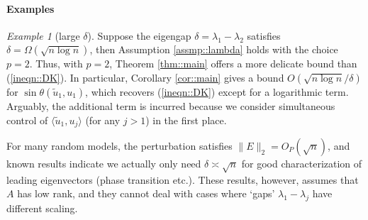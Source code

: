 \documentclass[12pt]{article}%
\theoremstyle{plain}%
\theoremstyle{remark}
\newtheorem{exm}{Example}[section]
\begin{document}
\paragraph{Examples} 
\begin{exm}[large $\delta$]
Suppose the eigengap $\delta = \lambda_1 - \lambda_2$ satisfies $\delta = \Omega(\sqrt{n \log n})$, then Assumption \ref{assmp::lambda} holds with the choice $p = 2$. Thus, with $p=2$, Theorem \ref{thm::main} offers a more delicate bound than (\ref{ineqn::DK}). In particular, Corollary \ref{cor::main} gives a bound $O(\sqrt{n \log n} / \delta)$ for $\sin \theta(\tilde{u}_1, u_1)$, which recovers (\ref{ineqn::DK}) except for a logarithmic term. Arguably, the additional term is incurred because we consider simultaneous control of $\langle \tilde{u}_1, u_j\rangle$ (for any $j > 1$) in the first place.

For many random models, the perturbation satisfies $\|  E\|_2 = O_P(\sqrt{n})$, and known results \citep{Ben11,BenNad12} indicate we actually only need $\delta \asymp \sqrt{n}$ for good characterization of leading eigenvectors (phase transition etc.). These results, however, assumes that $A$ has low rank, and they cannot deal with cases where `gaps' $\lambda_1 - \lambda_j$ have different scaling.

\end{exm}
\end{document}
